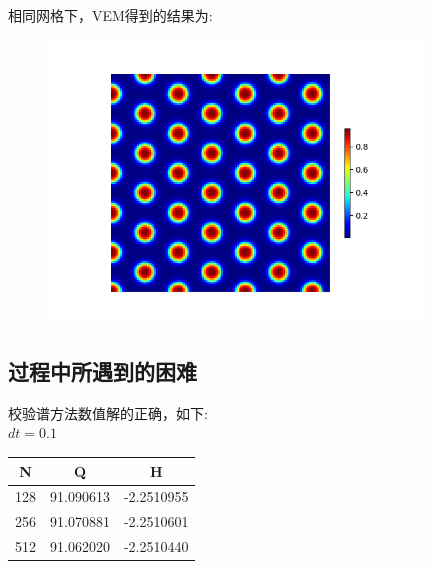 \documentclass[12pt]{article}
\begin{document}
\begin{CJK}{UTF8}{gkai}
\begin{figure}[H]
    \end{figure}
    相同网格下，VEM得到的结果为:\\
    \begin{figure}[H] 
    	\centering
    	\includegraphics[width=10cm]{scftfigure5770.png}
    \end{figure}         
     
     
     
     
     
    
    
    
    
    \subsection{过程中所遇到的困难}
    
    校验谱方法数值解的正确，如下:\\
    
    $dt=0.1$\\
     \begin{table}[H]
     	\centering
     	\begin{tabular}{ccc}
     		
     		\toprule
     		N&Q & H \\
     		\midrule    
     		128&91.090613&-2.2510955\\
     		256&91.070881&-2.2510601\\
     		512&91.062020&-2.2510440\\
     		\bottomrule
     	\end{tabular}
     \end{table} 
    
     
    

\end{CJK}
\end{document}
